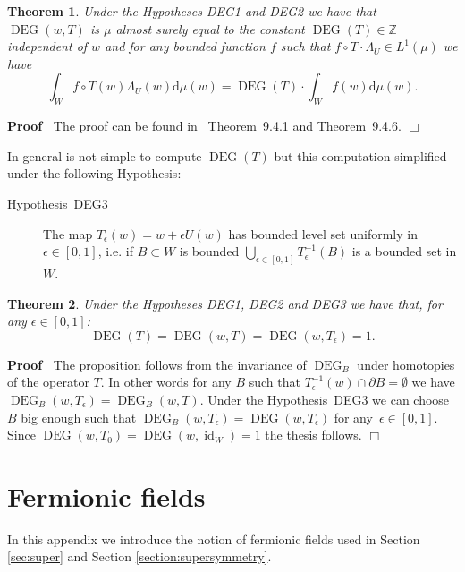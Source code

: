 \documentclass[a4paper,10pt]{article}
\newcommand{\mathd}{\mathrm{d}}
\newcommand{\tmop}[1]{\ensuremath{\operatorname{#1}}}
\newenvironment{proof}{\noindent\textbf{Proof\ }}{\hspace*{\fill}$\Box$\medskip}
\newtheorem{theorem}{Theorem}
\begin{document}
\begin{theorem}
  \label{theorem_wienerspace3}Under the Hypotheses DEG1 and DEG2 we have that
  $\tmop{DEG} (w, T)$ is $\mu$ almost surely equal to the constant $\tmop{DEG}
  (T) \in \mathbb{Z}$ independent of $w$ and for any bounded function $f$ such
  that $f \circ T \cdot \Lambda_U \in L^1 (\mu)$ we have
  \[ \int_W f \circ T (w) \Lambda_U (w) \mathd \mu (w) = \tmop{DEG} (T) \cdot
     \int_W f (w) \mathd \mu (w) . \]
\end{theorem}

\begin{proof}
  The proof can be found in~{\cite{Ustunel2000}} Theorem~9.4.1 and
  Theorem~9.4.6.
\end{proof}

In general is not simple to compute $\tmop{DEG} (T)$ but this computation
simplified under the following Hypothesis:
\begin{description}
  \item[Hypothesis~DEG3] The map $T_{\epsilon} (w) = w + \epsilon U (w)$ has
  bounded level set uniformly in $\epsilon \in [0, 1]$, i.e. if $B \subset W$
  is bounded $\bigcup_{\epsilon \in [0, 1]} T^{- 1}_{\epsilon} (B)$ is a
  bounded set in $W$.
\end{description}
\begin{theorem}
  \label{theorem_wienerspace4}Under the Hypotheses DEG1, DEG2 and DEG3 we have
  that, for any $\epsilon \in [0, 1]$:
  \[ \tmop{DEG} (T) = \tmop{DEG} (w, T) = \tmop{DEG} (w, T_{\epsilon}) = 1. \]
\end{theorem}

\begin{proof}
  The proposition follows from the invariance of $\tmop{DEG}_B$ under
  homotopies of the operator $T$. In other words for any $B$ such that $T^{-
  1}_{\epsilon} (w) \cap \partial B = \emptyset$ we have $\tmop{DEG}_B (w,
  T_{\epsilon}) = \tmop{DEG}_B (w, T)$. Under the Hypothesis~DEG3 we can
  choose $B$ big enough such that $\tmop{DEG}_B (w, T_{\epsilon}) = \tmop{DEG}
  (w, T_{\epsilon})$ for any~$\epsilon \in [0, 1]$. Since $\tmop{DEG} (w, T_0)
  = \tmop{DEG} (w, \tmop{id}_W) = 1$ the thesis follows.
\end{proof}

\section{Fermionic fields }\label{appendix_grasmannian}

In this appendix we introduce the notion of fermionic fields used in Section
\ref{sec:super} and Section \ref{section:supersymmetry}.
\end{document}
